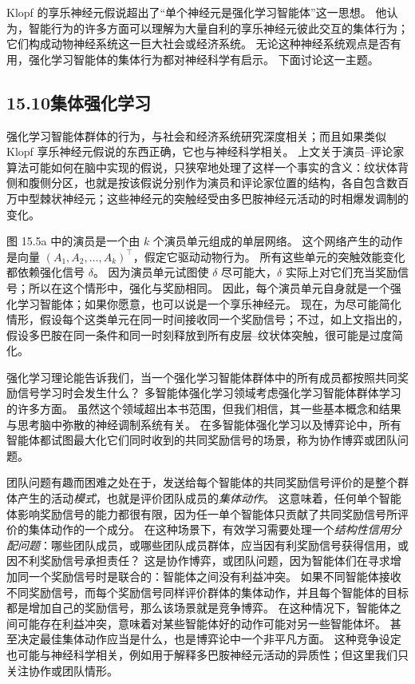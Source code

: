 \documentclass[UTF8, 12pt, fontset=fandol, oneside]{ctexart}
\begin{document}
Klopf 的享乐神经元假说超出了“单个神经元是强化学习智能体”这一思想。
他认为，智能行为的许多方面可以理解为大量自利的享乐神经元彼此交互的集体行为；它们构成动物神经系统这一巨大社会或经济系统。
无论这种神经系统观点是否有用，强化学习智能体的集体行为都对神经科学有启示。
下面讨论这一主题。

\subsection*{15.10\quad 集体强化学习}

强化学习智能体群体的行为，与社会和经济系统研究深度相关；而且如果类似 Klopf 享乐神经元假说的东西正确，它也与神经科学相关。
上文关于演员--评论家算法可能如何在脑中实现的假说，只狭窄地处理了这样一个事实的含义：纹状体背侧和腹侧分区，也就是按该假说分别作为演员和评论家位置的结构，各自包含数百万中型棘状神经元；这些神经元的突触经受由多巴胺神经元活动的时相爆发调制的变化。

图 15.5a 中的演员是一个由 $k$ 个演员单元组成的单层网络。
这个网络产生的动作是向量 $(A_1,A_2,\ldots,A_k)^\top$，假定它驱动动物行为。
所有这些单元的突触效能变化都依赖强化信号 $\delta$。
因为演员单元试图使 $\delta$ 尽可能大，$\delta$ 实际上对它们充当奖励信号；所以在这个情形中，强化与奖励相同。
因此，每个演员单元自身就是一个强化学习智能体；如果你愿意，也可以说是一个享乐神经元。
现在，为尽可能简化情形，假设每个这类单元在同一时间接收同一个奖励信号；不过，如上文指出的，假设多巴胺在同一条件和同一时刻释放到所有皮层--纹状体突触，很可能是过度简化。

强化学习理论能告诉我们，当一个强化学习智能体群体中的所有成员都按照共同奖励信号学习时会发生什么？
多智能体强化学习领域考虑强化学习智能体群体学习的许多方面。
虽然这个领域超出本书范围，但我们相信，其一些基本概念和结果与思考脑中弥散的神经调制系统有关。
在多智能体强化学习以及博弈论中，所有智能体都试图最大化它们同时收到的共同奖励信号的场景，称为协作博弈或团队问题。

团队问题有趣而困难之处在于，发送给每个智能体的共同奖励信号评价的是整个群体产生的活动\emph{模式}，也就是评价团队成员的\emph{集体动作}。
这意味着，任何单个智能体影响奖励信号的能力都很有限，因为任一单个智能体只贡献了共同奖励信号所评价的集体动作的一个成分。
在这种场景下，有效学习需要处理一个\emph{结构性信用分配问题}：哪些团队成员，或哪些团队成员群体，应当因有利奖励信号获得信用，或因不利奖励信号承担责任？
这是协作博弈，或团队问题，因为智能体们在寻求增加同一个奖励信号时是联合的：智能体之间没有利益冲突。
如果不同智能体接收不同奖励信号，而每个奖励信号同样评价群体的集体动作，并且每个智能体的目标都是增加自己的奖励信号，那么该场景就是竞争博弈。
在这种情况下，智能体之间可能存在利益冲突，意味着对某些智能体好的动作可能对另一些智能体坏。
甚至决定最佳集体动作应当是什么，也是博弈论中一个非平凡方面。
这种竞争设定也可能与神经科学相关，例如用于解释多巴胺神经元活动的异质性；但这里我们只关注协作或团队情形。
\end{document}
